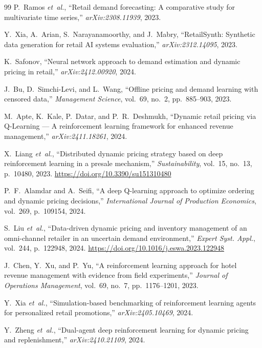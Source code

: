 \documentclass[journal, 10pt, twoside]{IEEEtran}
\begin{document}
\begin{thebibliography}{99}
P.~Ramos \textit{et~al.},
``Retail demand forecasting: A comparative study for multivariate time
series,''
\textit{arXiv:2308.11939}, 2023.

Y.~Xia, A.~Arian, S.~Narayanamoorthy, and J.~Mabry,
``RetailSynth: Synthetic data generation for retail AI systems
evaluation,''
\textit{arXiv:2312.14095}, 2023.

K.~Safonov,
``Neural network approach to demand estimation and dynamic pricing in
retail,''
\textit{arXiv:2412.00920}, 2024.

J.~Bu, D.~Simchi-Levi, and L.~Wang,
``Offline pricing and demand learning with censored data,''
\textit{Management Science}, vol.~69, no.~2, pp.~885--903, 2023.

M.~Apte, K.~Kale, P.~Datar, and P.~R.~Deshmukh,
``Dynamic retail pricing via Q-Learning --- A reinforcement learning
framework for enhanced revenue management,''
\textit{arXiv:2411.18261}, 2024.

X.~Liang \textit{et~al.},
``Distributed dynamic pricing strategy based on deep reinforcement
learning in a presale mechanism,''
\textit{Sustainability}, vol.~15, no.~13, p.~10480, 2023.
\url{https://doi.org/10.3390/su151310480}

P.~F.~Alamdar and A.~Seifi,
``A deep Q-learning approach to optimize ordering and dynamic pricing
decisions,''
\textit{International Journal of Production Economics}, vol.~269,
p.~109154, 2024.

S.~Liu \textit{et~al.},
``Data-driven dynamic pricing and inventory management of an omni-channel
retailer in an uncertain demand environment,''
\textit{Expert Syst. Appl.}, vol.~244, p.~122948, 2024.
\url{https://doi.org/10.1016/j.eswa.2023.122948}

J.~Chen, Y.~Xu, and P.~Yu,
``A reinforcement learning approach for hotel revenue management with
evidence from field experiments,''
\textit{Journal of Operations Management}, vol.~69, no.~7,
pp.~1176--1201, 2023.

Y.~Xia \textit{et~al.},
``Simulation-based benchmarking of reinforcement learning agents for
personalized retail promotions,''
\textit{arXiv:2405.10469}, 2024.

Y.~Zheng \textit{et~al.},
``Dual-agent deep reinforcement learning for dynamic pricing and
replenishment,''
\textit{arXiv:2410.21109}, 2024.


\end{thebibliography}
\end{document}
